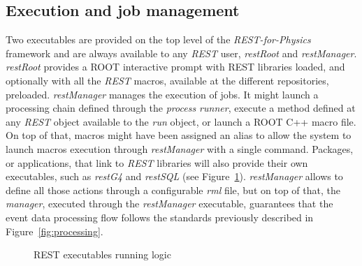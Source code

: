 

\subsection{Execution and job management}
Two executables are provided on the top level of the \emph{REST-for-Physics} framework and are always available to any \emph{REST} user, \emph{restRoot} and \emph{restManager}. 
\emph{restRoot} provides a ROOT interactive prompt with REST libraries loaded, and optionally with all the \emph{REST} macros, available at the different repositories, preloaded. 
\emph{restManager} manages the execution of jobs. It might launch a processing chain defined through the \emph{process runner}, execute a method defined at any \emph{REST} object available to the \emph{run} object, or launch a ROOT C++ macro file. On top of that, macros might have been assigned an alias to allow the system to launch macros execution through \emph{restManager} with a single command. Packages, or applications, that link to \emph{REST} libraries will also provide their own executables, such as \emph{restG4} and \emph{restSQL}  (see Figure~\ref{fig:executables}). \emph{restManager} allows to define all those actions through a configurable \emph{rml} file, but on top of that, the \emph{manager}, executed through the \emph{restManager} executable, guarantees that the event data processing flow follows the standards previously described in Figure~\ref{fig:processing}.

\begin{figure}[htb!]
  \centering
	\caption{REST executables running logic}\label{fig:executables}
\end{figure}

